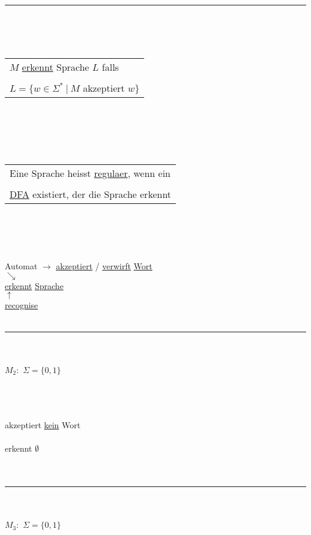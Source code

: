 \documentclass[18pt,a4paper]{scrreprt}
\newcommand{\tab}{\hspace*{2em}}
\begin{document}
\\
\rule{\textwidth}{0.4mm}\\
\\
\\
\begin{tabular}{|p{10cm}}
$M$ \uline{erkennt} Sprache $L$ falls\\
\\
$L = \{w \in \Sigma^{*} \:\vert\: M$ akzeptiert $w\}$\\
\end{tabular}
\\
\\
\\
\\
\begin{tabular}{|p{10cm}}
Eine Sprache heisst \uline{regulaer}, wenn ein\\
\\
\uline{DFA} existiert, der die Sprache erkennt\\ 
\end{tabular}
\\
\\
\\
\\
Automat $\rightarrow$ \uline{akzeptiert} / \uline{verwirft} \uline{Wort}\\
\tab $\searrow$\\
\tab \uline{erkennt} \uline{Sprache}\\
\tab\tab $\uparrow$\\
\tab \uline{recognise}
\\
\\
\rule{\textwidth}{0.4mm}\\
\\
$M_2:$ \tab $\Sigma = \{0,1\}$\\
\\
\\
\\
akzeptiert \uline{kein} Wort\\
\\
erkennt $\emptyset$\\
\\
\\
\rule{\textwidth}{0.4mm}\\
\\
$M_3:$ \tab $\Sigma = \{0,1\}$\\
\end{document}
